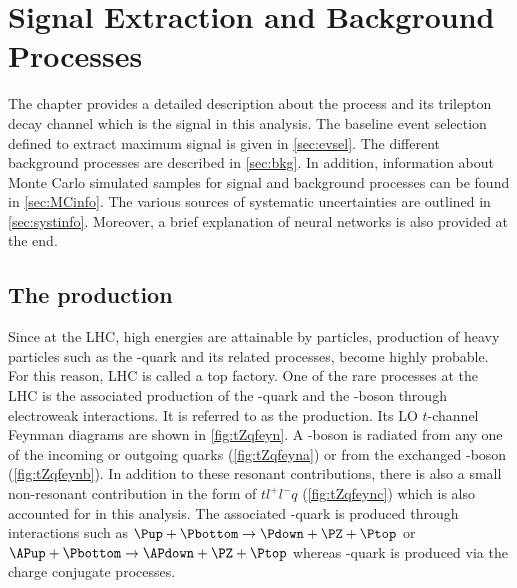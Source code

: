 
\chapter{Signal Extraction and Background Processes}
\label{sec:tZq}
The chapter provides a detailed description about the \tZq process and its trilepton decay channel
which is the signal in this analysis. The baseline event selection defined to extract maximum signal is
given in \cref{sec:evsel}. The different background processes are described in
\cref{sec:bkg}. In addition, information about Monte Carlo simulated samples for signal and 
background processes can be found in \cref{sec:MCinfo}. The various sources of systematic uncertainties
are outlined in \cref{sec:systinfo}. Moreover, a brief explanation of neural networks is also provided 
at the end. 
\section{The \tZqsec production}
Since at the LHC, high energies are attainable by particles, production of heavy particles such as the
\Ptop-quark and its related processes, become highly probable. For this reason, LHC is called a top 
factory. One of the
rare processes at the LHC is the associated production of the \Ptop-quark and the 
\PZ-boson through electroweak interactions. It is referred to as the \tZq production. Its LO $t$-channel
Feynman diagrams are shown in \cref{fig:tZqfeyn}. A \PZ-boson is radiated from any one of the incoming or outgoing 
quarks (\cref{fig:tZqfeyna}) or from the exchanged \PW-boson (\cref{fig:tZqfeynb}). In addition to these
resonant contributions, there is also a small non-resonant contribution 
in the form of $tl^+l^-q$ (\cref{fig:tZqfeync}) which is also accounted for in this analysis. 
The associated \Ptop-quark is produced through interactions such as $\Pup+\Pbottom \rightarrow \Pdown+\PZ+\Ptop$ or 
$\APup+\Pbottom \rightarrow \APdown+\PZ+\Ptop$ whereas \APtop-quark is produced 
via the charge conjugate processes. 



